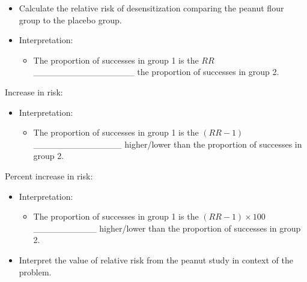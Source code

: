 \documentclass[
]{report}
\providecommand{\tightlist}{%
  \setlength{\itemsep}{0pt}\setlength{\parskip}{0pt}}
\begin{document}
\begin{itemize}
\tightlist
\item
  Calculate the relative risk of desensitization comparing the peanut flour group to the placebo group.
\end{itemize}

\vspace{0.8in}


\begin{itemize}
\item
  Interpretation:

  \begin{itemize}
  \tightlist
  \item
    The proportion of successes in group 1 is the \(RR\) \_\_\_\_\_\_\_\_\_\_\_\_\_\_\_\_ the proportion of successes in group 2.
  \end{itemize}
\end{itemize}

Increase in risk:

\vspace{0.3in}

\begin{itemize}
\item
  Interpretation:

  \begin{itemize}
  \tightlist
  \item
    The proportion of successes in group 1 is the \((RR-1)\) \_\_\_\_\_\_\_\_\_\_\_\_\_\_
    higher/lower than the proportion of successes in group 2.
  \end{itemize}
\end{itemize}

Percent increase in risk:

\vspace{0.3in}

\begin{itemize}
\item
  Interpretation:

  \begin{itemize}
  \tightlist
  \item
    The proportion of successes in group 1 is the \((RR-1)\times 100\) \_\_\_\_\_\_\_\_\_\_ higher/lower than the proportion of successes in group 2.
  \end{itemize}
\end{itemize}


\begin{itemize}
\tightlist
\item
  Interpret the value of relative risk from the peanut study in context of the problem.
\end{itemize}
\end{document}
